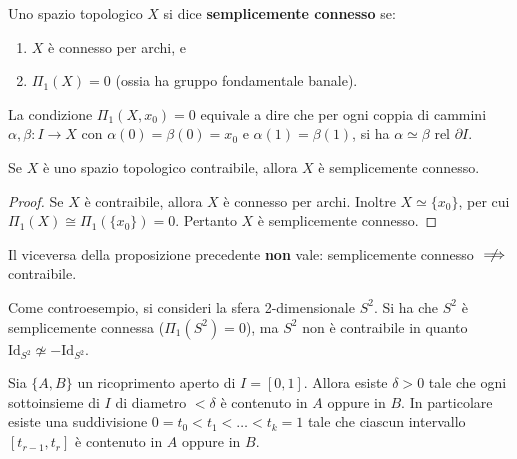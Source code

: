 \begin{definicion}
Uno spazio topologico $X$ si dice \textbf{semplicemente connesso} se:
\begin{enumerate}
    \item $X$ è connesso per archi, e
    \item $\Pi_1(X) = 0$ (ossia ha gruppo fondamentale banale).
\end{enumerate}
\end{definicion}

\begin{observacion}
La condizione $\Pi_1(X, x_0) = 0$ equivale a dire che per ogni coppia di cammini $\alpha, \beta: I \to X$ con $\alpha(0) = \beta(0) = x_0$ e $\alpha(1) = \beta(1)$, si ha $\alpha \simeq \beta \text{ rel } \partial I$.
\end{observacion}

\begin{prop}
Se $X$ è uno spazio topologico contraibile, allora $X$ è semplicemente connesso.
\end{prop}

\begin{proof}
Se $X$ è contraibile, allora $X$ è connesso per archi. Inoltre $X \simeq \{x_0\}$, per cui $\Pi_1(X) \cong \Pi_1(\{x_0\}) = 0$. Pertanto $X$ è semplicemente connesso.
\end{proof}

\begin{observacion}
Il viceversa della proposizione precedente \textbf{non} vale: semplicemente connesso $\centernot\implies$ contraibile.

Come controesempio, si consideri la sfera 2-dimensionale $S^2$. Si ha che $S^2$ è semplicemente connessa ($\Pi_1(S^2) = 0$), ma $S^2$ non è contraibile in quanto $\mathrm{Id}_{S^2} \not\simeq -\mathrm{Id}_{S^2}$.
\end{observacion}

\vspace{1.5em}


\vspace{1.5em}

\begin{lema}
Sia $\{A, B\}$ un ricoprimento aperto di $I = [0,1]$. Allora esiste $\delta > 0$ tale che ogni sottoinsieme di $I$ di diametro $< \delta$ \`e contenuto in $A$ oppure in $B$. In particolare esiste una suddivisione $0 = t_0 < t_1 < \dots < t_k = 1$ tale che ciascun intervallo $[t_{r-1}, t_r]$ \`e contenuto in $A$ oppure in $B$.
\end{lema}

